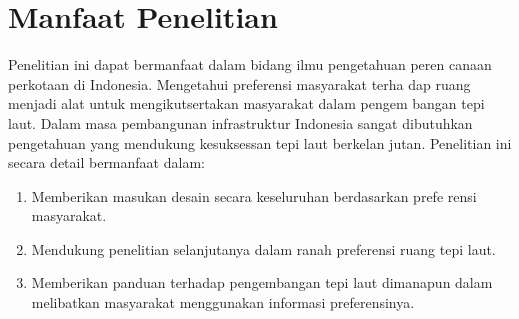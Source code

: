 \documentclass[../projects/thesis.tex]{subfiles}
\begin{document}
\section{Manfaat Penelitian}

Penelitian ini dapat bermanfaat dalam bidang ilmu pengetahuan peren­ canaan perkotaan di Indonesia. Mengetahui preferensi masyarakat terha­ dap ruang menjadi alat untuk mengikutsertakan masyarakat dalam pengem­ bangan tepi laut. Dalam masa pembangunan infrastruktur Indonesia sangat dibutuhkan pengetahuan yang mendukung kesuksessan tepi laut berkelan­ jutan. Penelitian ini secara detail bermanfaat dalam:

\begin{enumerate}
\item Memberikan masukan desain secara keseluruhan berdasarkan prefe­ rensi masyarakat.
\item Mendukung penelitian selanjutanya dalam ranah preferensi ruang tepi laut.
\item Memberikan panduan terhadap pengembangan tepi laut dimanapun dalam melibatkan masyarakat menggunakan informasi preferensinya.
\end{enumerate}
\end{document}
